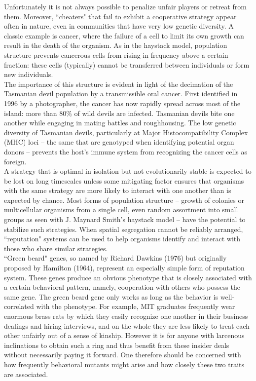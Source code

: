 \documentclass{article}
\begin{document}
Unfortunately it is not always possible to penalize unfair players or retreat from them. Moreover, ``cheaters" that fail to exhibit a cooperative strategy appear often in nature, even in communities that have very low genetic diversity. A classic example is cancer, where the failure of a cell to limit its own growth can result in the death of the organism. As in the haystack model, population structure prevents cancerous cells from rising in frequency above a certain fraction: these cells (typically) cannot be transferred between individuals or form new individuals.\\

The importance of this structure is evident in light of the decimation of the Tasmanian devil population by a transmissible oral cancer. First identified in 1996 by a photographer, the cancer has now rapidly spread across most of the island: more than 80\% of wild devils are infected. Tasmanian devils bite one another while engaging in mating battles and roughhousing. The low genetic diversity of Tasmanian devils, particularly at Major Histocompatibility Complex (MHC) loci -- the same that are genotyped when identifying potential organ donors -- prevents the host's immune system from recognizing the cancer cells as foreign.\\

A strategy that is optimal in isolation but not evolutionarily stable is expected to be lost on long timescales unless some mitigating factor ensures that organisms with the same strategy are more likely to interact with one another than is expected by chance. Most forms of population structure -- growth of colonies or multicellular organisms from a single cell, even random assortment into small groups as seen with J. Maynard Smith's haystack model -- have the potential to stabilize such strategies. When spatial segregation cannot be reliably arranged, ``reputation" systems can be used to help organisms identify and interact with those who share similar strategies.\\

``Green beard" genes, so named by Richard Dawkins (1976) but originally proposed by Hamilton (1964), represent an especially simple form of reputation system. These genes produce an obvious phenotype that is closely associated with a certain behavioral pattern, namely, cooperation with others who possess the same gene. The green beard gene only works as long as the behavior is well-correlated with the phenotype. For example, MIT graduates frequently wear enormous brass rats by which they easily recognize one another in their business dealings and hiring interviews, and on the whole they are less likely to treat each other unfairly out of a sense of kinship. However it is for anyone with larcenous inclinations to obtain such a ring and thus benefit from these insider deals without necessarily paying it forward. One therefore should be concerned with how frequently behavioral mutants might arise and how closely these two traits are associated.\\
\end{document}
